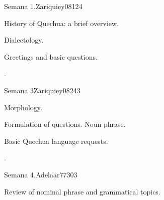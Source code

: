\begin{syllabus}
\begin{competences}
    \item {}
\end{competences}

\begin{unit}{Semana 1.}{}{Zariquiey08}{12}{4}
   \begin{topics}
      \item History of Quechua: a brief overview.
      \item Dialectology.
      \item Greetings and basic questions.
   \end{topics}

   \begin{learningoutcomes}
      \item .
   \end{learningoutcomes}
\end{unit}


\begin{unit}{Semana 3}{}{Zariquiey08}{24}{3}
   \begin{topics}
      \item Morphology.
      \item Formulation of questions. Noun phrase.
      \item Basic Quechua language requests.
   \end{topics}

   \begin{learningoutcomes}
      \item .
     
   \end{learningoutcomes}
\end{unit}

\begin{unit}{Semana 4.}{}{Adelaar77}{30}{3}
   \begin{topics}
      \item Review of nominal phrase and grammatical topics.
   \end{topics}


\end{unit}
\end{syllabus}
